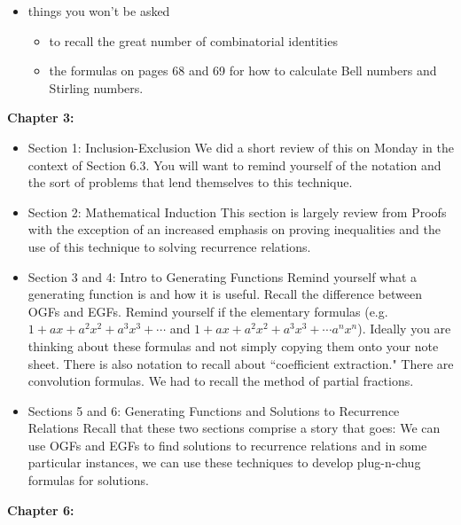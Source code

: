 \documentclass[11pt]{article}
\begin{document}
\begin{itemize}
\item things you won't be asked
	\begin{itemize}
	\item to recall the great number of combinatorial identities
	\item the formulas on pages 68 and 69 for how to calculate Bell numbers and  Stirling numbers.
	\end{itemize}
\end{itemize}


\noindent\textbf{Chapter 3:} 

\begin{itemize}
\item Section 1: Inclusion-Exclusion
We did a short review of this on Monday in the context of Section 6.3. You will want to remind yourself of the notation and the sort of problems that lend themselves to this technique.\\
\item Section 2: Mathematical Induction
This section is largely review from Proofs with the exception of an increased emphasis on proving inequalities and the use of this technique to solving recurrence relations.\\
\item Section 3 and 4: Intro to Generating Functions
Remind yourself what a generating function is and how it is useful. Recall the difference between OGFs and EGFs. Remind yourself if the elementary formulas (e.g. $1+ax+a^2x^2 + a^3x^3+ \cdots$ and  $1+ax+a^2 x^2 + a^3x^3+ \cdots a^nx^n$). Ideally you are thinking about these formulas and not simply copying them onto your note sheet. There is also notation to recall about ``coefficient extraction." There are convolution formulas. We had to recall the method of partial fractions.\\
\item Sections 5 and 6: Generating Functions and Solutions to Recurrence Relations
Recall that these two sections comprise a story that goes: We can use OGFs and EGFs to find solutions to recurrence relations and in some particular instances, we can use these techniques to develop plug-n-chug formulas for solutions.\\
\end{itemize}

\noindent\textbf{Chapter 6:}
\end{document}
